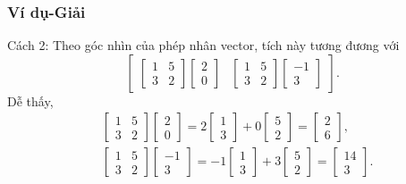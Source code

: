 \begin{frame}
    \frametitle{Ví dụ-Giải}
    Cách 2: Theo góc nhìn của phép nhân vector, tích này tương đương với 
\[\begin{bmatrix}
    \begin{bmatrix}
        1&5\\3&2
    \end{bmatrix}\begin{bmatrix}
        2\\0
    \end{bmatrix} &\begin{bmatrix}
        1&5\\3&2
    \end{bmatrix}\begin{bmatrix}
        -1\\3
    \end{bmatrix}
\end{bmatrix}.\]
Dễ thấy, \begin{align*}
    &\begin{bmatrix}
        1&5\\3&2
    \end{bmatrix}\begin{bmatrix}
        2\\0
    \end{bmatrix}=2\begin{bmatrix}
        1\\3
    \end{bmatrix}+0\begin{bmatrix}
        5\\2
    \end{bmatrix}=\begin{bmatrix}
        2\\6
    \end{bmatrix},\\
    &\begin{bmatrix}
        1&5\\3&2
    \end{bmatrix}\begin{bmatrix}
        -1\\3
    \end{bmatrix}=-1\begin{bmatrix}
        1\\3
    \end{bmatrix}+3\begin{bmatrix}
        5\\2
    \end{bmatrix}=\begin{bmatrix}
        14\\3
    \end{bmatrix}.
\end{align*}
\end{frame}
